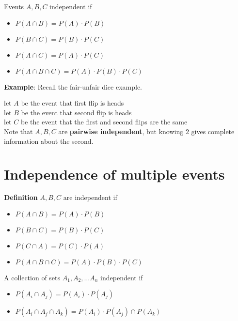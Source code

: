 \begin{framed}
   Events $A, B, C$ independent if
   \begin{itemize}
      \item $P(A \cap B) = P(A) \cdot P(B)$
      \item $P(B \cap C) = P(B) \cdot P(C)$
      \item $P(A \cap C) = P(A) \cdot P(C)$
      \item $P(A \cap B \cap C) = P(A) \cdot P(B) \cdot P(C)$
   \end{itemize}
\end{framed}


\textbf{Example}: Recall the fair-unfair dice example. 

let $A$ be the event that first flip is heads \\
let $B$ be the event that second flip is heads \\
let $C$ be the event that the first and second flips are the same \\

Note that $A, B, C$ are \textbf{pairwise independent}, but knowing 2 gives complete information about the second. 

\section{Independence of multiple events}

\begin{framed}
   \textbf{Definition} $A, B, C$ are independent if
   \begin{itemize}
      \item $P(A \cap B) = P(A) \cdot P(B)$
      \item $P(B \cap C) = P(B) \cdot P(C)$
      \item $P(C \cap A) = P(C) \cdot P(A)$
      \item $P(A \cap B \cap C) = P(A) \cdot P(B) \cdot P(C)$
   \end{itemize}

   A collection of sets $A_1, A_2, \hdots A_n$ independent if 
   \begin{itemize}
      \item $P(A_i \cap A_j) = P(A_i) \cdot P(A_j)$
      \item $P(A_i \cap A_j \cap A_k) = P(A_i) \cdot P(A_j) \cap P(A_k)$
     
   \end{itemize}
   
\end{framed}

